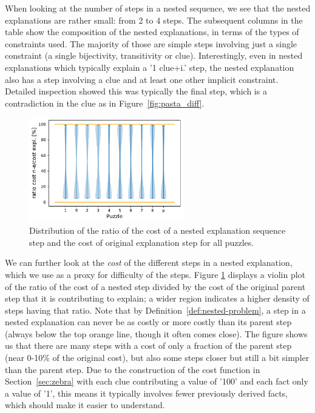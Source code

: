 When looking at the number of steps in a nested sequence, we see that the nested explanations are rather small: from 2 to 4 steps.
The subsequent columns in the table show the composition of the nested explanations, in terms of the types of constraints used. 
The majority of those are simple steps involving just a single constraint (a single bijectivity, transitivity or clue). 
Interestingly, even in nested explanations which typically explain a '1 clue+i.' step, the nested explanation also has a step involving a clue and at least one other implicit constraint. 
Detailed inspection showed this was typically the final step, which is a contradiction in the clue as in Figure~\ref{fig:pasta_diff}. 

\begin{figure}[h]
	\centering
	\includegraphics[width=0.6\textwidth]{figures/violin_plot.pdf}
	\caption{Distribution of the ratio of the cost of a nested explanation sequence step and the cost of original explanation step for all puzzles. 
	} 
	\label{fig:experiments:violin}
\end{figure}

We can further look at the \textit{cost} of the different steps in a nested explanation, which we use as a proxy for difficulty of the steps. 
Figure \ref{fig:experiments:violin} displays a violin plot of the ratio of the cost of a nested step divided by the cost of the original parent step that it is contributing to explain; a wider region indicates a higher density of steps having that ratio. 
Note that by Definition~\ref{def:nested-problem}, a step in a nested explanation can never be as costly or more costly than its parent step (always below the top orange line, though it often comes close).
The figure shows us that there are many steps with a cost of only a fraction of the parent step (near 0-10\% of the original cost), but also some steps closer but still a bit simpler than the parent step. 
Due to the construction of the cost function in Section~\ref{sec:zebra} with each clue contributing a value of '100' and each fact only a value of '1', this means it typically involves fewer previously derived facts, which should make it easier to understand. 
